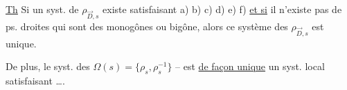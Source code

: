 \uline{Th} Si un syst. de $\rho_{\vec D,s}$ existe satisfaisant
a) b) c) d) e) f) \uline{et si} il n'existe pas de ps. droites
qui sont des monogônes ou bigône, alors
ce système des $\rho_{\vec D,s}$ est unique.

De plus, le syst. des $\Omega(s)=\{\rho_s,\rho_s^{-1}\}$ -- est
\uline{de façon unique} un syst. local satisfaisant
 \ldots.

